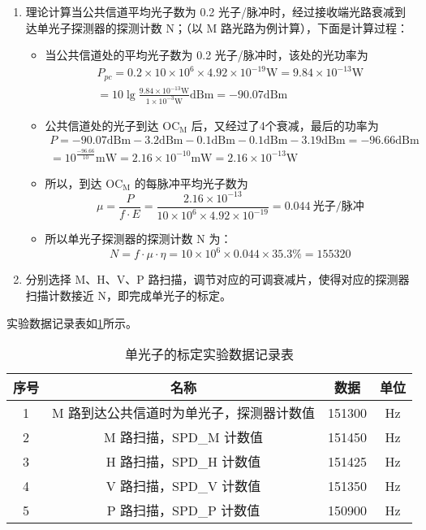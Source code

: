 \documentclass[dvipsnames, svgnames,a4paper,11pt]{article}
\begin{document}
		\begin{enumerate}
			\item 理论计算当公共信道平均光子数为 0.2 光子/脉冲时，经过接收端光路衰减到达单光子探测器的探测计数 N；（以 M 路光路为例计算），下面是计算过程：
				\begin{itemize}
					\item 当公共信道处的平均光子数为 0.2 光子/脉冲时，该处的光功率为
						\begin{align*}
							P_{pc} = 0.2 \times 10 \times 10^{6} \times 4.92 \times 10^{-19} \mathrm{W} = 9.84 \times 10^{-13} \mathrm{W}	\\
							= 10 \lg \frac{9.84 \times 10^{-13} \mathrm{W}}{1 \times 10^{-3} \mathrm{W}} \mathrm{dBm} = -90.07 \mathrm{dBm} 
						\end{align*}

					\item 公共信道处的光子到达 $\mathrm{OC_M}$ 后，又经过了4个衰减，最后的功率为
						\begin{align*}
							P = -90.07 \mathrm{dBm} - 3.2 \mathrm{dBm} - 0.1 \mathrm{dBm} - 0.1 \mathrm{dBm} - 3.19 \mathrm{dBm} = -96.66 \mathrm{dBm}	\\
							= 10^{\frac{-96.66}{10}} \mathrm{mW} = 2.16 \times 10^{-10} \mathrm{mW} = 2.16 \times 10^{-13} \mathrm{W}
						\end{align*}

					\item 所以，到达 $\mathrm{OC_M}$ 的每脉冲平均光子数为 
						$$ \mu = \frac{P}{f \cdot E} = \frac{2.16 \times 10^{-13}}{10 \times 10^{6} \times 4.92 \times 10^{-19}} = 0.044 \ \text{光子/脉冲} $$

					\item 所以单光子探测器的探测计数 N 为：
						$$ N = f \cdot \mu \cdot \eta = 10 \times 10^{6} \times 0.044 \times 35.3 \% = 155320 $$
				\end{itemize}

			\item 分别选择 M、H、V、P 路扫描，调节对应的可调衰减片，使得对应的探测器扫描计数接近 N，即完成单光子的标定。
		\end{enumerate}

		实验数据记录表如\cref{tbl:D3-3-1}所示。



			\begin{table}[htbp]
				\centering
				\begin{tabular}{|c|c|cc|} 
				\hline
				序号 & 名称                    & 数据     & 单位  \\ 
				\hline
				1  & M 路到达公共信道时为单光子，探测器计数值 & 151300 & Hz  \\
				2  & M 路扫描，SPD\_M 计数值      & 151450 & Hz  \\
				3  & H 路扫描，SPD\_H 计数值      & 151425 & Hz  \\
				4  & V 路扫描，SPD\_V 计数值      & 151350 & Hz  \\
				5  & P 路扫描，SPD\_P 计数值      & 150900 & Hz  \\
				\hline
				\end{tabular}
				\caption{单光子的标定实验数据记录表}
				\label{tbl:D3-3-1}
			\end{table}
\end{document}
